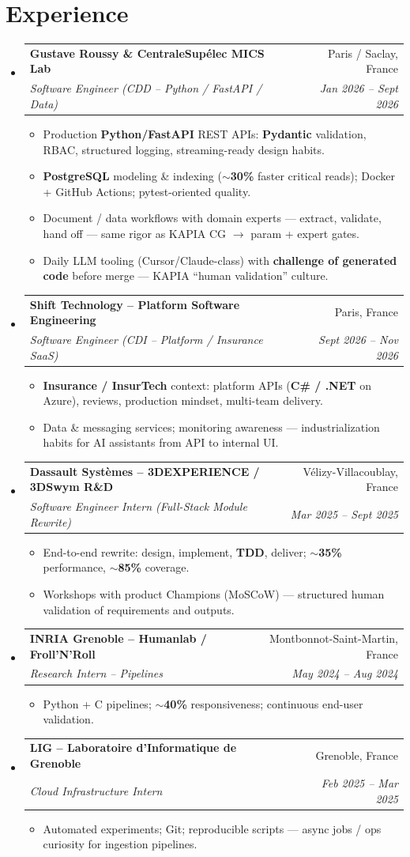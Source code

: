 \documentclass[letterpaper,10.5pt]{article}
\makeatletter
\newcommand{\resumeItem}[1]{\item\small{#1 \vspace{-1.5pt}}}
\newcommand{\resumeSubheading}[4]{\vspace{-1pt}\item\begin{tabular*}{0.97\textwidth}[t]{l@{\extracolsep{\fill}}r}\textbf{#1} & #2 \\\textit{\small#3} & \textit{\small #4} \\\end{tabular*}\vspace{-5pt}}
\newcommand{\resumeSubHeadingListStart}{\begin{itemize}[leftmargin=0.15in, label={}]}
\newcommand{\resumeSubHeadingListEnd}{\end{itemize}}
\newcommand{\resumeItemListStart}{\begin{itemize}[leftmargin=0.18in]}
\newcommand{\resumeItemListEnd}{\end{itemize}\vspace{-3pt}}
\makeatother
\begin{document}
\section{Experience}
\resumeSubHeadingListStart
  \resumeSubheading
    {Gustave Roussy \& CentraleSup\'elec MICS Lab}{Paris / Saclay, France}
    {Software Engineer (CDD -- Python / FastAPI / Data)}{Jan 2026 -- Sept 2026}
    \resumeItemListStart
      \resumeItem{Production \textbf{Python/FastAPI} REST APIs: \textbf{Pydantic} validation, RBAC, structured logging, streaming-ready design habits.}
      \resumeItem{\textbf{PostgreSQL} modeling \& indexing (\textbf{$\sim$30\%} faster critical reads); Docker + GitHub Actions; pytest-oriented quality.}
      \resumeItem{Document / data workflows with domain experts --- extract, validate, hand off --- same rigor as KAPIA CG $\rightarrow$ param + expert gates.}
      \resumeItem{Daily LLM tooling (Cursor/Claude-class) with \textbf{challenge of generated code} before merge --- KAPIA ``human validation'' culture.}
    \resumeItemListEnd
  \resumeSubheading
    {Shift Technology -- Platform Software Engineering}{Paris, France}
    {Software Engineer (CDI -- Platform / Insurance SaaS)}{Sept 2026 -- Nov 2026}
    \resumeItemListStart
      \resumeItem{\textbf{Insurance / InsurTech} context: platform APIs (\textbf{C\# / .NET} on Azure), reviews, production mindset, multi-team delivery.}
      \resumeItem{Data \& messaging services; monitoring awareness --- industrialization habits for AI assistants from API to internal UI.}
    \resumeItemListEnd
  \resumeSubheading
    {Dassault Syst\`emes -- 3DEXPERIENCE / 3DSwym R\&D}{V\'elizy-Villacoublay, France}
    {Software Engineer Intern (Full-Stack Module Rewrite)}{Mar 2025 -- Sept 2025}
    \resumeItemListStart
      \resumeItem{End-to-end rewrite: design, implement, \textbf{TDD}, deliver; \textbf{$\sim$35\%} performance, \textbf{$\sim$85\%} coverage.}
      \resumeItem{Workshops with product Champions (MoSCoW) --- structured human validation of requirements and outputs.}
    \resumeItemListEnd
  \resumeSubheading
    {INRIA Grenoble -- Humanlab / Froll'N'Roll}{Montbonnot-Saint-Martin, France}
    {Research Intern -- Pipelines}{May 2024 -- Aug 2024}
    \resumeItemListStart
      \resumeItem{Python + C pipelines; \textbf{$\sim$40\%} responsiveness; continuous end-user validation.}
    \resumeItemListEnd
  \resumeSubheading
    {LIG -- Laboratoire d'Informatique de Grenoble}{Grenoble, France}
    {Cloud Infrastructure Intern}{Feb 2025 -- Mar 2025}
    \resumeItemListStart
      \resumeItem{Automated experiments; Git; reproducible scripts --- async jobs / ops curiosity for ingestion pipelines.}
    \resumeItemListEnd
\resumeSubHeadingListEnd
\end{document}
